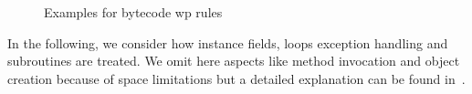 \begin{figure}[t]
\begin{frameit}

 \end{frameit}
\caption{\sc Examples for bytecode wp rules}
 \label{instrWP}

\end{figure}

In the following, we consider how instance fields, %
loops exception handling and subroutines are treated. We omit here aspects like method invocation and object creation because of space limitations but a detailed explanation can be found in~\cite{JBL05MP}. 

%





